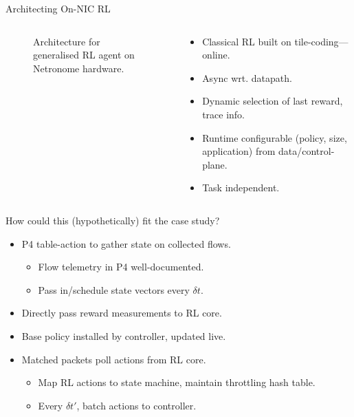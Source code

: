 \documentclass[aspectratio=169,xcolor={dvipsnames}
,handout
]{beamer}
\begin{document}
\begin{frame}{Architecting On-NIC RL}
\begin{columns}
\begin{column}{0.6\linewidth}
\begin{figure}
{}
				\caption{Architecture for generalised RL agent on Netronome hardware.}
			\end{figure}
		\end{column}
		\begin{column}{0.4\linewidth}
			\begin{itemize}
				\item Classical RL built on tile-coding---\alert{online}.
				\item Async wrt. datapath.
				\item Dynamic selection of last reward, trace info.
				\item \alert{Runtime configurable} (policy, size, application) from data/control-plane.
				\item \alert{Task independent.}
			\end{itemize}
		\end{column}
	\end{columns}
\end{frame}

\begin{frame}{How could this (hypothetically) fit the case study?}
	\begin{itemize}
		\item P4 table-action to gather state on collected flows.
		\begin{itemize}
			\item Flow telemetry in P4 well-documented.
			\item Pass in/schedule state vectors every $\delta{}t$.
		\end{itemize}
		\item Directly pass reward measurements to RL core.
		\item Base policy installed by controller, updated live.
		\item Matched packets poll actions from RL core.
		\begin{itemize}
			\item Map RL actions to state machine, maintain throttling hash table.
			\item Every $\delta{}t'$, batch actions to controller.
		\end{itemize}
	\end{itemize}
\end{frame}
\end{document}

